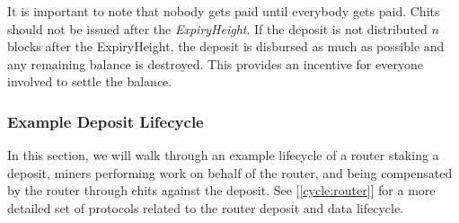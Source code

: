 \documentclass[UTF8, 10pt, nonatbib, nocopyrightspace, reprint]{sigplanconf}
\newcommand{\secref}[1]{[\autoref{#1}]}
\begin{document}
It is important to note that nobody gets paid until everybody gets paid. Chits should not be issued after the \emph{ExpiryHeight}. If the deposit is not distributed $n$ blocks after the ExpiryHeight, the deposit is disbursed as much as possible and any remaining balance is destroyed. This provides an incentive for everyone involved to settle the balance.

\subsubsection{Example Deposit Lifecycle}

In this section, we will walk through an example lifecycle of a router staking a deposit, miners performing work on behalf of the router, and being compensated by the router through chits against the deposit. See \secref{cycle:router} for a more detailed set of protocols related to the router deposit and data lifecycle.
\end{document}
